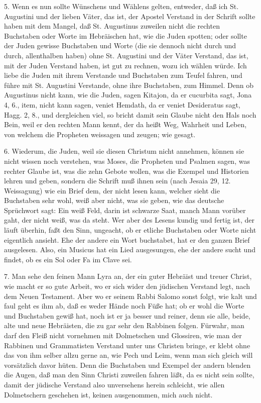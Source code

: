 5. Wenn es nun sollte Wünschens und Wählens gelten, entweder, daß ich St. Augustini und der lieben Väter, das ist, der Apostel Verstand in der Schrift sollte haben mit dem Mangel, daß St. Augustinus zuweilen nicht die rechten Buchstaben oder Worte im Hebräischen hat, wie die Juden spotten; oder sollte der Juden gewisse Buchstaben und Worte (die sie dennoch nicht durch und durch, allenthalben haben) ohne St. Augustini und der Väter Verstand, das ist, mit der Juden Verstand haben, ist gut zu rechnen, wozu ich wählen würde. Ich liebe die Juden mit ihrem Verstande und Buchstaben zum Teufel fahren, und führe mit St. Augustini Verstande, ohne ihre Buchstaben, zum Himmel. Denn ob Augustinus nicht kann, wie die Juden, sagen Kitajon, da er cucurbita sagt, Jona 4, 6., item, nicht kann sagen, veniet Hemdath, da er veniet Desideratus sagt, Hagg. 2, 8., und dergleichen viel, so bricht damit sein Glaube nicht den Hals noch Bein, weil er den rechten Mann kennt, der da heißt Weg, Wahrheit und Leben, von welchem die Propheten weissagen und zeugen; wie gesagt.

6. Wiederum, die Juden, weil sie diesen Christum nicht annehmen, können sie nicht wissen noch verstehen, was Moses, die Propheten und Psalmen sagen, was rechter Glaube ist, was die zehn Gebote wollen, was die Exempel und Historien lehren und geben, sondern die Schrift muß ihnen sein (nach Jesaia 29, 12. Weissagung) wie ein Brief dem, der nicht lesen kann, welcher sieht die Buchstaben sehr wohl, weiß aber nicht, was sie geben, wie das deutsche Sprüchwort sagt: Ein weiß Feld, darin ist schwarze Saat, manch Mann vorüber gaht, der nicht weiß, was da steht. Wer aber des Lesens kundig und fertig ist, der läuft überhin, faßt den Sinn, ungeacht, ob er etliche Buchstaben oder Worte nicht eigentlich ansieht. Ehe der andere ein Wort buchstabet, hat er den ganzen Brief ausgelesen. Also, ein Musicus hat ein Lied ausgesungen, ehe der andere sucht und findet, ob es ein Sol oder Fa im Clave sei.

7. Man sehe den feinen Mann Lyra an, der ein guter Hebräist und treuer Christ, wie macht er so gute Arbeit, wo er sich wider den jüdischen Verstand legt, nach dem Neuen Testament. Aber wo er seinem Rabbi Salomo sonst folgt, wie kalt und faul geht es ihm ab, daß es weder Hände noch Füße hat; ob er wohl die Worte und Buchstaben gewiß hat, noch ist er ja besser und reiner, denn sie alle, beide, alte und neue Hebräisten, die zu gar sehr den Rabbinen folgen. Fürwahr, man darf den Fleiß nicht vornehmen mit Dolmetschen und Glossiren, wie man der Rabbinen und Grammatisten Verstand unter uns Christen bringe, er klebt ohne das von ihm selber allzu gerne an, wie Pech und Leim, wenn man sich gleich will vorsätzlich davor hüten. Denn die Buchstaben und Exempel der andern blenden die Augen, daß man den Sinn Christi zuweilen fahren läßt, da es nicht sein sollte, damit der jüdische Verstand also unversehens herein schleicht, wie allen Dolmetschern geschehen ist, keinen ausgenommen, mich auch nicht.

